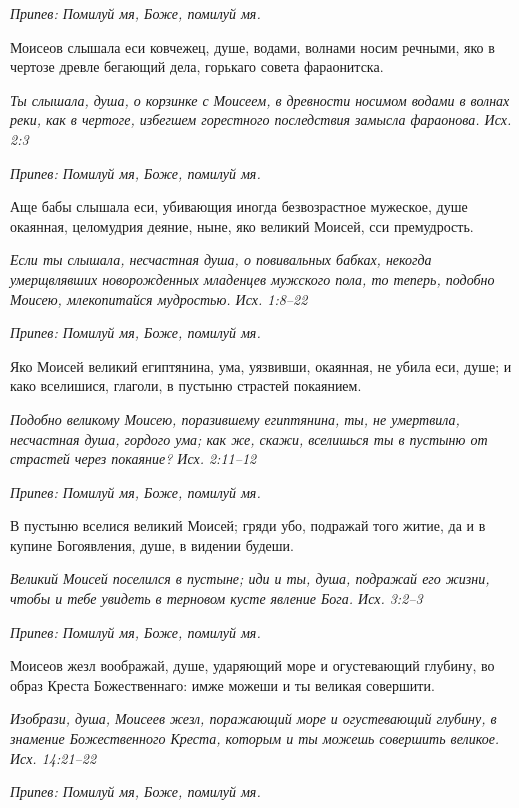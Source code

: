 \itshape Припев:\normalfont{} Помилуй мя, Боже, помилуй мя.


Моисеов слышала еси ковчежец, душе, водами, волнами носим речными, яко в чертозе древле бегающий дела, горькаго совета фараонитска.


\itshape Ты слышала, душа, о корзинке с Моисеем, в древности носимом водами в волнах реки, как в чертоге, избегшем горестного последствия замысла фараонова. Исх. 2:3\normalfont{}


\itshape Припев:\normalfont{} Помилуй мя, Боже, помилуй мя.


Аще бабы слышала еси, убивающия иногда безвозрастное мужеское, душе окаянная, целомудрия деяние, ныне, яко великий Моисей, сси премудрость.


\itshape Если ты слышала, несчастная душа, о повивальных бабках, некогда умерщвлявших новорожденных младенцев мужского пола, то теперь, подобно Моисею, млекопитайся мудростью. Исх. 1:8–22\normalfont{}


\itshape Припев:\normalfont{} Помилуй мя, Боже, помилуй мя.


Яко Моисей великий египтянина, ума, уязвивши, окаянная, не убила еси, душе; и како вселишися, глаголи, в пустыню страстей покаянием.


\itshape Подобно великому Моисею, поразившему египтянина, ты, не умертвила, несчастная душа, гордого ума; как же, скажи, вселишься ты в пустыню от страстей через покаяние? Исх. 2:11–12\normalfont{}


\itshape Припев:\normalfont{} Помилуй мя, Боже, помилуй мя.


В пустыню вселися великий Моисей; гряди убо, подражай того житие, да и в купине Богоявления, душе, в видении будеши.


\itshape Великий Моисей поселился в пустыне; иди и ты, душа, подражай его жизни, чтобы и тебе увидеть в терновом кусте явление Бога. Исх. 3:2–3\normalfont{}


\itshape Припев:\normalfont{} Помилуй мя, Боже, помилуй мя.


Моисеов жезл воображай, душе, ударяющий море и огустевающий глубину, во образ Креста Божественнаго: имже можеши и ты великая совершити.


\itshape Изобрази, душа, Моисеев жезл, поражающий море и огустевающий глубину, в знамение Божественного Креста, которым и ты можешь совершить великое. Исх. 14:21–22\normalfont{}


\itshape Припев:\normalfont{} Помилуй мя, Боже, помилуй мя.


